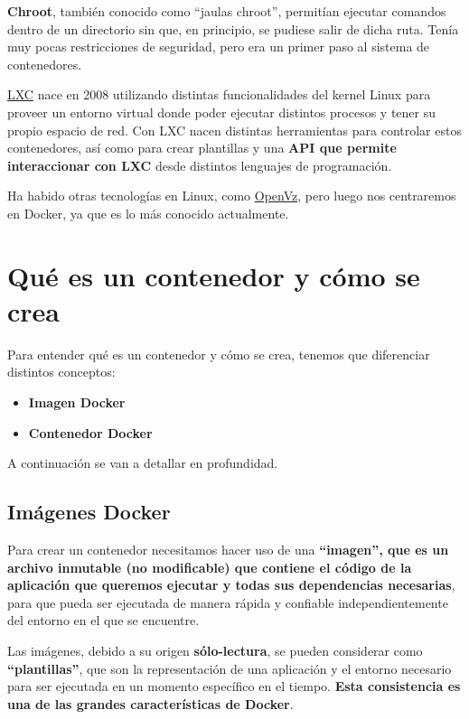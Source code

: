 \textbf{Chroot}, también conocido como “jaulas chroot”, permitían ejecutar comandos dentro de un directorio sin que, en principio, se pudiese salir de dicha ruta. Tenía muy pocas restricciones de seguridad, pero era un primer paso al sistema de contenedores.

\href{https://es.wikipedia.org/wiki/LXC}{LXC} nace en 2008 utilizando distintas funcionalidades del kernel Linux para proveer un entorno virtual donde poder ejecutar distintos procesos y tener su propio espacio de red. Con LXC nacen distintas herramientas para controlar estos contenedores, así como para crear plantillas y una \textbf{API que permite interaccionar con LXC} desde distintos lenguajes de programación.

Ha habido otras tecnologías en Linux, como \href{https://es.wikipedia.org/wiki/OpenVZ}{OpenVz}, pero luego nos centraremos en Docker, ya que es lo más conocido actualmente.


\section{Qué es un contenedor y cómo se crea}

Para entender qué es un contenedor y cómo se crea, tenemos que diferenciar distintos conceptos:
\begin{itemize}
    \item \textbf{Imagen Docker}
    \item \textbf{Contenedor Docker}
\end{itemize}

A continuación se van a detallar en profundidad.

\subsection{Imágenes Docker}

Para crear un contenedor necesitamos hacer uso de una \textbf{“imagen”, que es un archivo inmutable (no modificable) que contiene el código de la aplicación que queremos ejecutar y todas sus dependencias necesarias}, para que pueda ser ejecutada de manera rápida y confiable independientemente del entorno en el que se encuentre.

Las imágenes, debido a su origen \textbf{sólo-lectura}, se pueden considerar como \textbf{“plantillas”}, que son la representación de una aplicación y el entorno necesario para ser ejecutada en un momento específico en el tiempo. \textbf{Esta consistencia es una de las grandes características de Docker}.

